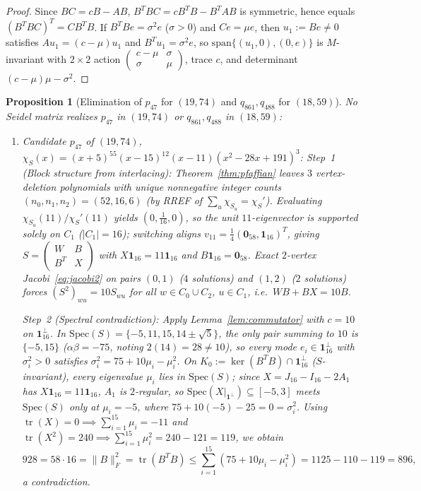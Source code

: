 \documentclass[11pt,reqno]{amsart}
\newtheorem{proposition}[theorem]{Proposition}
\theoremstyle{definition}
\theoremstyle{remark}
\DeclareMathOperator{\tr}{tr}
\begin{document}
\begin{proof}
Since $BC = cB - AB$, $B^T B C = c B^T B - B^T A B$ is symmetric, hence equals $(B^T B C)^T = C B^T B$. If $B^T B e = \sigma^2 e$ ($\sigma > 0$) and $Ce = \mu e$, then $u_1 := Be \neq 0$ satisfies $A u_1 = (c - \mu) u_1$ and $B^T u_1 = \sigma^2 e$, so $\mathrm{span}\{(u_1, 0), (0, e)\}$ is $M$-invariant with $2 \times 2$ action $\left(\begin{smallmatrix} c-\mu & \sigma \\ \sigma & \mu \end{smallmatrix}\right)$, trace $c$, and determinant $(c-\mu)\mu - \sigma^2$.
\end{proof}

\begin{proposition}[Elimination of $p_{47}$ for $(19, 74)$ and $q_{861}, q_{488}$ for $(18, 59)$]\label{prop:kills47_861_488}
No Seidel matrix realizes $p_{47}$ in $(19, 74)$ or $q_{861}, q_{488}$ in $(18, 59)$:
\begin{enumerate}
  \item \emph{Candidate $p_{47}$ of $(19, 74)$, $\chi_S(x) = (x+5)^{55}(x-15)^{12}(x-11)(x^2 - 28x + 191)^3$:}
  \emph{Step~1 (Block structure from interlacing):} Theorem~\ref{thm:pfaffian} leaves $3$ vertex-deletion polynomials with unique nonnegative integer counts $(n_0, n_1, n_2) = (52, 16, 6)$ (by RREF of $\sum_u \chi_{S_u} = \chi_S'$). Evaluating $\chi_{S_u}(11)/\chi_S'(11)$ yields $(0, \frac{1}{16}, 0)$, so the unit $11$-eigenvector is supported solely on $C_1$ ($|C_1| = 16$); switching aligns $v_{11} = \frac{1}{4}(\mathbf{0}_{58}, \mathbf{1}_{16})^T$, giving $S = \left(\begin{smallmatrix} W & B \\ B^T & X \end{smallmatrix}\right)$ with $X\mathbf{1}_{16} = 11\mathbf{1}_{16}$ and $B\mathbf{1}_{16} = \mathbf{0}_{58}$. Exact $2$-vertex Jacobi~\eqref{eq:jacobi2} on pairs $(0,1)$ ($4$ solutions) and $(1,2)$ ($2$ solutions) forces $(S^2)_{wu} = 10 S_{wu}$ for all $w \in C_0 \cup C_2$, $u \in C_1$, i.e.\ $WB + BX = 10B$.

  \emph{Step~2 (Spectral contradiction):} Apply Lemma~\ref{lem:commutator} with $c = 10$ on $\mathbf{1}_{16}^\perp$. In $\mathrm{Spec}(S) = \{-5, 11, 15, 14 \pm \sqrt{5}\}$, the only pair summing to $10$ is $\{-5, 15\}$ ($\alpha\beta = -75$, noting $2(14) = 28 \neq 10$), so every mode $e_i \in \mathbf{1}_{16}^\perp$ with $\sigma_i^2 > 0$ satisfies $\sigma_i^2 = 75 + 10\mu_i - \mu_i^2$. On $K_0 := \ker(B^T B) \cap \mathbf{1}_{16}^\perp$ ($S$-invariant), every eigenvalue $\mu_i$ lies in $\mathrm{Spec}(S)$; since $X = J_{16} - I_{16} - 2A_1$ has $X\mathbf{1}_{16} = 11\mathbf{1}_{16}$, $A_1$ is $2$-regular, so $\mathrm{Spec}(X|_{\mathbf{1}^\perp}) \subseteq [-5, 3]$ meets $\mathrm{Spec}(S)$ only at $\mu_i = -5$, where $75 + 10(-5) - 25 = 0 = \sigma_i^2$. Using $\tr(X) = 0 \implies \sum_{i=1}^{15}\mu_i = -11$ and $\tr(X^2) = 240 \implies \sum_{i=1}^{15}\mu_i^2 = 240 - 121 = 119$, we obtain
  \[
    928 = 58 \cdot 16 = \|B\|_F^2 = \tr(B^T B) \le \sum_{i=1}^{15} (75 + 10\mu_i - \mu_i^2) = 1125 - 110 - 119 = 896,
  \]
  a contradiction.


\end{enumerate}
\end{proposition}
\end{document}
